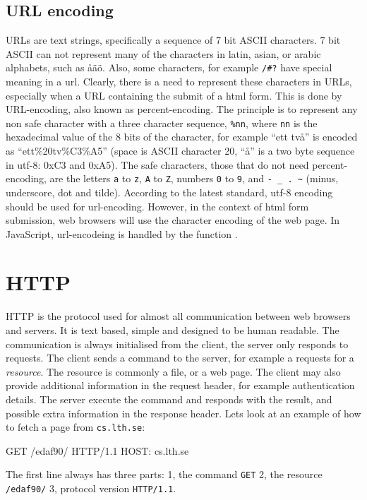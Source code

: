 \subsection{URL encoding} \label{section:url:encoding}
URLs are text strings, specifically a sequence of 7 bit ASCII characters. 7 bit ASCII can not represent many of the characters in latin, asian, or arabic alphabets, such as åäö. Also, some characters, for example \texttt{/\#?} have special meaning in a url. Clearly, there is a need to represent these characters in URLs, especially when a URL containing the submit of a html form. This is done by URL-encoding, also known as percent-encoding. The principle is to represent any non safe character with a three character sequence, \texttt{\%nn}, where \texttt{nn} is the hexadecimal value of the 8 bits of the character, for example  ``ett två'' is encoded as ``ett\%20tv\%C3\%A5'' (space is ASCII character 20, ``å'' is a two byte sequence in utf-8: 0xC3 and 0xA5). The safe characters, those that do not need percent-encoding, are the letters \texttt{a} to \texttt{z}, \texttt{A} to \texttt{Z}, numbers \texttt{0} to \texttt{9}, and \texttt{- \_ . \textasciitilde} (minus, underscore, dot and tilde). According to the latest standard, utf-8 encoding should be used for url-encoding. However, in the context of html form submission, web browsers will use the character encoding of the web page. In JavaScript, url-encodeing is handled by the function .
	
\section{HTTP} \label{section:http}
HTTP is the protocol used for almost all communication between web browsers and servers. It is text based, simple and designed to be human readable. The communication is always initialised from the client, the server only responds to requests. The client sends a command to the server, for example a requests for a \emph{resource}. The resource is commonly a file, or a web page. The client may also provide additional information  in the request header, for example authentication details. The server execute the command and responds with the result, and possible extra information in the response header. Lets look at an example of how to fetch a page from \texttt{cs.lth.se}:
\begin{Code}
GET /edaf90/ HTTP/1.1
HOST: cs.lth.se

\end{Code}
The first line always has three parts: 1, the command \texttt{GET} 2, the resource \texttt{/edaf90/} 3, protocol version \texttt{HTTP/1.1}.

